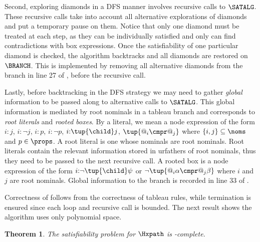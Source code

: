 \documentclass[10pt,a4paper]{amsart}
\newtheorem{thm}{Theorem}[section]
\theoremstyle{definition}
\theoremstyle{remark}
\begin{document}
\begin{description}
        Second, exploring diamonds in a DFS manner involves recursive calls to $\SATALG$.
        These recursive calls take into account all alternative explorations of diamonds and put a temporary pause on them. Notice that only one diamond must be treated at each step, as they can be individually satisfied and only can find contradictions with box expressions. Once the satisfiability of one particular diamond is checked, the algorithm backtracks and all diamonds are restored on $\BRANCH$. 
        This is implemented by removing all alternative diamonds from the branch in line 27 of , before the recursive call.

        Lastly, before backtracking in the DFS strategy we may need to gather \emph{global} information to be passed along to alternative calls to $\SATALG$.
        This global information %
        is mediated by root nominals in a tableau branch and corresponds to \emph{root literals} and \emph{rooted boxes}.
        By a literal, we mean a node expression of the form $i{:}j$, $i{:}\lnot j$, $i{:}p$, $i{:}\lnot p$, $i{:}\tup{\child}j$, $\tup{@_i \cmpr @_j}$ where $\{i,j\} \subseteq \noms$ and $p \in \props$.
        A root literal is one whose nominals are root nominals.
        Root literals contain the relevant information stored in urfathers of root nominals, thus they need to be passed to the next recursive call.
        A rooted box is a node expression of the form $i{:}\lnot\tup{\child}\psi$ or $\lnot\tup{@_i\alpha \cmpr @_j\beta}$ where $i$ and $j$ are root nominals.
        Global information to the branch is recorded in line 33 of .
\end{description}


Correctness of  follows from the correctness of tableau rules, while termination is ensured since each loop and recursive call is bounded. The next result shows the algorithm uses only polynomial space.


\begin{thm}
    \label{th:satpspace}
    The satisfiability problem for $\Hxpath$ is \pspace-complete.
\end{thm}
\end{document}
